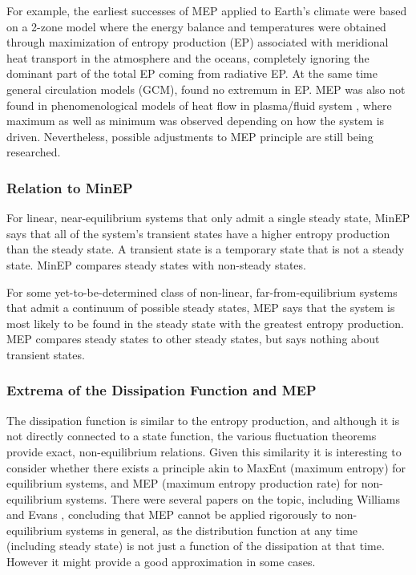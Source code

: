 \documentclass[a4paper,12pt]{article}
\begin{document}
For example, the earliest successes of MEP applied to Earth's climate were based on a 2-zone model where the energy balance and temperatures were obtained through maximization of entropy production (EP) associated with meridional heat transport in the atmosphere and the oceans, completely ignoring the dominant part of the total EP coming from radiative EP. At the same time general circulation models (GCM), found no extremum in EP. MEP was also not found in phenomenological models of heat flow in plasma/fluid system \cite{Kawazura:2010dy}, where maximum as well as minimum was observed depending on how the system is driven. Nevertheless, possible adjustments to MEP principle are still being researched.

\subsubsection{Relation to MinEP}
For linear, near-equilibrium systems that only admit a single steady state, MinEP says that all of the system's transient states have a higher entropy production than the steady state. A transient state is a temporary state that is not a steady state. MinEP compares steady states with non-steady states.

For some yet-to-be-determined class of non-linear, far-from-equilibrium systems that admit a continuum of possible steady states, MEP says that the system is most likely to be found in the steady state with the greatest entropy production. MEP compares steady states to other steady states, but says nothing about transient states.


\subsubsection{Extrema of the Dissipation Function and MEP}
The dissipation function is similar to the entropy production, and although it is not directly connected to a state function, the various fluctuation theorems provide exact, non-equilibrium relations. Given this similarity it is interesting to consider whether there exists a principle akin to MaxEnt (maximum entropy) for equilibrium systems, and MEP (maximum entropy production rate) for non-equilibrium systems. There were several papers on the topic, including Williams and Evans \cite{Williams:2008ft}, concluding that MEP cannot be applied rigorously to non-equilibrium systems in general, as the distribution function at any time (including steady state) is not just a function of the dissipation at that time. However it might provide a good approximation in some cases.
\end{document}
